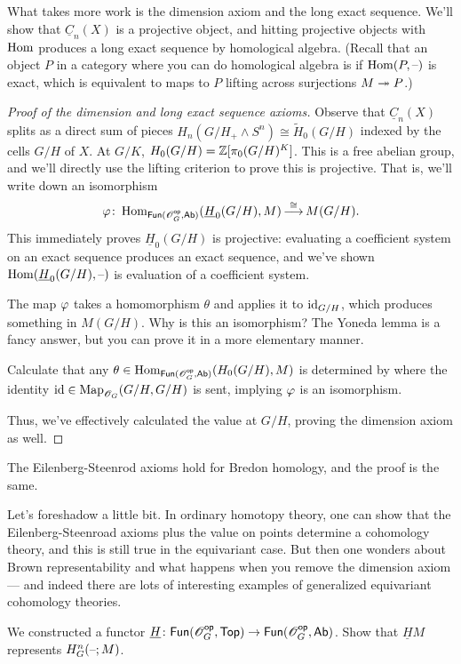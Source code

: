 What takes more work is the dimension axiom and the long exact sequence. We'll show that $\underline C_n(X)$ is a
projective object, and hitting projective objects with $\operatorname{Hom}$ produces a long exact sequence by homological
algebra. (Recall that an object $P$ in a category where you can do homological algebra is  if
$\operatorname{Hom}(P,\text{--})$ is exact, which is equivalent to maps to $P$ lifting across surjections $M\twoheadrightarrow P$.)
\begin{proof}[Proof of the dimension and long exact sequence axioms]
Observe that $\underline C_n(X)$ splits as a direct sum of pieces $H_n(G/H_+\wedge S^n)\cong \widetilde H_0(G/H)$
indexed by the cells $G/H$ of $X$. At $G/K$, $H_0(G/H) = \mathbb Z[\pi_0(G/H)^K]$. This is a free abelian group, and
we'll directly use the lifting criterion to prove this is projective. That is, we'll write down an isomorphism
\[\varphi\colon\operatorname{Hom}_{\mathsf{Fun}(\mathscr O_G^{\mathsf{op}}, \mathsf{Ab})}(\underline H_0(G/H), M) \mathop{\longrightarrow}\limits^{\cong} M(G/H).\]
This immediately proves $\underline H_0(G/H)$ is projective: evaluating a coefficient system on an exact sequence
produces an exact sequence, and we've shown $\operatorname{Hom}(\underline H_0(G/H), \text{--})$ is evaluation of a coefficient system.

The map $\varphi$ takes a homomorphism $\theta$ and applies it to $\mathrm{id}_{G/H}$, which produces something in $M(G/H)$.
Why is this an isomorphism? The Yoneda lemma is a fancy answer, but you can prove it in a more elementary manner.
\begin{ex}
Calculate that any $\theta\in\operatorname{Hom}_{\mathsf{Fun}(\mathscr O_G^{\mathsf{op}}, \mathsf{Ab})}(H_0(G/H), M)$ is determined by where the identity
$\mathrm{id}\in\operatorname{Map}_{\mathscr O_G}(G/H, G/H)$ is sent, implying $\varphi$ is an isomorphism.
\end{ex}
Thus, we've effectively calculated the value at $G/H$, proving the dimension axiom as well.
\end{proof}
The Eilenberg-Steenrod axioms hold for Bredon homology, and the proof is the same.
\begin{rem}
Let's foreshadow a little bit. In ordinary homotopy theory, one can show that the Eilenberg-Steenroad axioms
plus the value on points determine a cohomology theory, and this is still true in the equivariant case. But then
one wonders about Brown representability and what happens when you remove the dimension axiom --- and indeed
there are lots of interesting examples of generalized equivariant cohomology theories.
\end{rem}
\begin{ex}
We constructed a functor $\underline H\colon\mathsf{Fun}(\mathscr O_G^{\mathsf{op}},\mathsf{Top})\to \mathsf{Fun}(\mathscr O_G^{\mathsf{op}}, \mathsf{Ab})$. Show that $\underline HM$
represents $H_G^n(\text{--}; M)$.
\end{ex}
